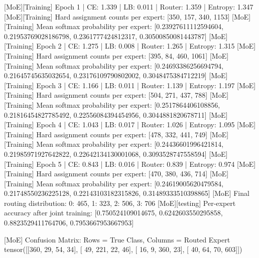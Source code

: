 [MoE][Training] Epoch 1 | CE: 1.339 | LB: 0.011 | Router: 1.359 | Entropy: 1.347
[MoE][Training] Hard assignment counts per expert: [350, 157, 340, 1153]
[MoE][Training] Mean softmax probability per expert: [0.23927611112594604, 0.21953769028186798, 0.2361777424812317, 0.30500850081443787]
[MoE][Training] Epoch 2 | CE: 1.275 | LB: 0.008 | Router: 1.265 | Entropy: 1.315
[MoE][Training] Hard assignment counts per expert: [395, 84, 460, 1061]
[MoE][Training] Mean softmax probability per expert: [0.24693386256694794, 0.21645745635032654, 0.23176109790802002, 0.3048475384712219]
[MoE][Training] Epoch 3 | CE: 1.166 | LB: 0.011 | Router: 1.139 | Entropy: 1.197
[MoE][Training] Hard assignment counts per expert: [504, 271, 437, 788]
[MoE][Training] Mean softmax probability per expert: [0.2517864406108856, 0.21816454827785492, 0.22556084394454956, 0.3044881820678711]
[MoE][Training] Epoch 4 | CE: 1.043 | LB: 0.017 | Router: 1.026 | Entropy: 1.095
[MoE][Training] Hard assignment counts per expert: [478, 332, 441, 749]
[MoE][Training] Mean softmax probability per expert: [0.24436601996421814, 0.21985971927642822, 0.22642134130001068, 0.3093528747558594]
[MoE][Training] Epoch 5 | CE: 0.843 | LB: 0.016 | Router: 0.839 | Entropy: 0.974
[MoE][Training] Hard assignment counts per expert: [470, 380, 436, 714]
[MoE][Training] Mean softmax probability per expert: [0.24619005620479584, 0.21748550236225128, 0.22143103182315826, 0.31489333510398865]
[MoE] Final routing distribution: {0: 465, 1: 323, 2: 506, 3: 706}
[MoE][testing] Per-expert accuracy after joint training: [0.750524109014675, 0.6242603550295858, 0.8823529411764706, 0.7953667953667953]

[MoE] Confusion Matrix: Rows = True Class, Columns = Routed Expert
tensor([[360,  29,  54,  34],
[ 49, 221,  22,  46],
[ 16,   9, 360,  23],
[ 40,  64,  70, 603]])